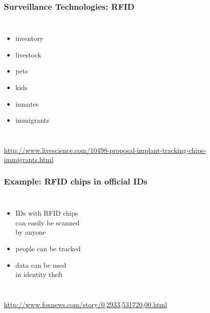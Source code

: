 \documentclass[dvipsnames]{beamer}
\theoremstyle{definition}
\theoremstyle{example}
\theoremstyle{plain}
\begin{document}
\begin{frame}
  \frametitle{Surveillance Technologies: RFID}

  \begin{columns}
    \begin{itemize}
      \item inventory
      \item livestock

      \pause
      \medskip
      \item pets
      \item kids
      \item inmates
      \item immigrants
    \end{itemize}

  \end{columns}

  \medskip
  \tiny{\url{http://www.livescience.com/10498-proposal-implant-tracking-chips-immigrants.html}}\\
\end{frame}

\begin{frame}
  \frametitle{Example: RFID chips in official IDs}

  \begin{columns}

    \begin{itemize}
      \item IDs with RFID chips\\
        can easily be scanned\\
        by anyone
      \item people can be tracked
      \item data can be used\\
        in identity theft
    \end{itemize}
  \end{columns}

  \medskip
  \tiny{\url{http://www.foxnews.com/story/0,2933,531720,00.html}}\\
\end{frame}
\end{document}

